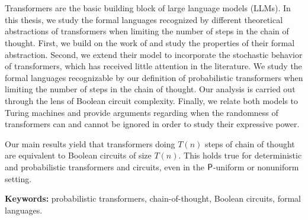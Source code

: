 \chapter*{\runtitle}

\noindent
Transformers are the basic building block of large language models (LLMs).
In this thesis, we study the formal languages recognized by different theoretical abstractions of transformers when limiting the number of steps in the chain of thought.
First, we build on the work of \citet{toyota} and study the properties of their formal abstraction.
Second, we extend their model to incorporate the stochastic behavior of transformers, which has received little attention in the literature.
We study the formal languages recognizable by our definition of probabilistic transformers when limiting the number of steps in the chain of thought.
Our analysis is carried out through the lens of Boolean circuit complexity.
Finally, we relate both models to Turing machines and provide arguments regarding when the randomness of transformers can and cannot be ignored in order to study their expressive power.

Our main results yield that transformers doing $T(n)$ steps of chain of thought are equivalent to Boolean circuits of size $T(n)$.
This holds true for deterministic and probabilistic transformers and circuits, even in the $\mathsf{P}$-uniform or nonuniform setting.

\bigskip

\noindent\textbf{Keywords:} probabilistic transformers, chain-of-thought, Boolean circuits, formal languages.